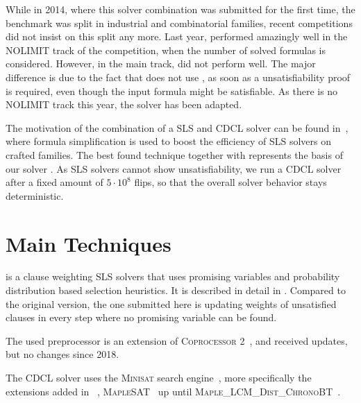 \documentclass[conference]{IEEEtran}
\begin{document}
While in 2014, where this solver combination was submitted for the first time, the benchmark was split in industrial and combinatorial families, recent competitions did not insist on this split any more.
Last year, \str performed amazingly well in the \textsc{NOLIMIT} track of the competition, when the number of solved formulas is considered.
However, in the main track, \str did not perform well.
The major difference is due to the fact that \str does not use \sparrow, as soon as a unsatisfiability proof is required, even though the input formula might be satisfiable.
As there is no \textsc{NOLIMIT} track this year, the solver has been adapted.

The motivation of the combination of a SLS and CDCL solver can be found in~\cite{bm-pos-2013}, where formula simplification is used to boost the efficiency of SLS solvers on crafted families. 
The best found technique together with \sparrow represents the basis of our solver \scp.
As SLS solvers cannot show unsatisfiability, we run a CDCL solver after a fixed amount of $5\cdot10^8$ flips, so that the overall solver behavior stays deterministic.


\section{Main Techniques}

\sparrow is a clause weighting SLS solvers that uses promising variables and probability distribution based selection heuristics.
It is described in detail in \cite{Balint:2010:ISL:2164073.2164078}.
Compared to the original version, the one submitted here is updating weights of unsatisfied clauses in every step where no promising variable can be found. 

The used preprocessor \cpt is an extension of \textsc{Coprocessor 2}~\cite{Manthey:2012:CFC:2352219.2352264}, and received updates, but no changes since 2018.

The CDCL solver \mergesat uses the \textsc{Minisat} search engine~\cite{DBLP:conf/sat/EenS03}, more specifically the extensions added in \glucose~\cite{lbd,Audemard:2012:RRS:2405292.2405308},
\textsc{MapleSAT}~\cite{MapleSAT} up until \textsc{Maple\_LCM\_Dist\_ChronoBT}~\cite{MapleLCMDistChronoBT}.
\end{document}
